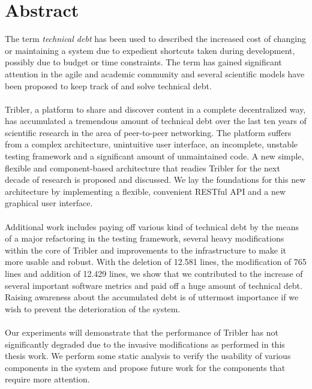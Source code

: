 \chapter*{Abstract}
The term \emph{technical debt} has been used to described the increased cost of changing or maintaining a system due to expedient shortcuts taken during development, possibly due to budget or time constraints. The term has gained significant attention in the agile and academic community and several scientific models have been proposed to keep track of and solve technical debt.\\\\
Tribler, a platform to share and discover content in a complete decentralized way, has accumulated a tremendous amount of technical debt over the last ten years of scientific research in the area of peer-to-peer networking.
The platform suffers from a complex architecture, unintuitive user interface, an incomplete, unstable testing framework and a significant amount of unmaintained code.
A new simple, flexible and component-based architecture that readies Tribler for the next decade of research is proposed and discussed.
We lay the foundations for this new architecture by implementing a flexible, convenient RESTful API and a new graphical user interface.\\\\
Additional work includes paying off various kind of technical debt by the means of a major refactoring in the testing framework, several heavy modifications within the core of Tribler and improvements to the infrastructure to make it more usable and robust.
With the deletion of 12.581 lines, the modification of 765 lines and addition of 12.429 lines, we show that we contributed to the increase of several important software metrics and paid off a huge amount of technical debt. Raising awareness about the accumulated debt is of uttermost importance if we wish to prevent the deterioration of the system.\\\\
Our experiments will demonstrate that the performance of Tribler has not significantly degraded due to the invasive modifications as performed in this thesis work. We perform some static analysis to verify the usability of various components in the system and propose future work for the components that require more attention.
